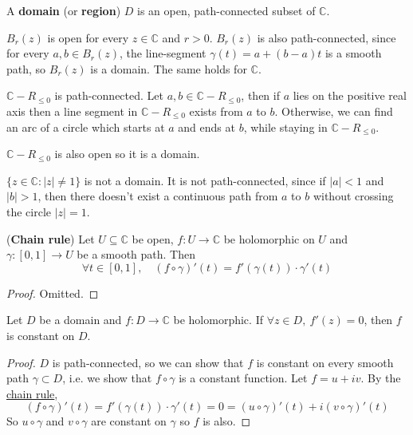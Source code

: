 \begin{definition}
	A \textbf{domain} (or \textbf{region}) $D$ is an open, path-connected subset of $\mathbb{C}$.
\end{definition}

\begin{example}
	$B_r(z)$ is open for every $z \in \mathbb{C}$ and $r > 0$. $B_r(z)$ is also path-connected, since for every $a, b \in B_r(z)$, the line-segment $\gamma(t) = a + (b - a)t$ is a smooth path, so $B_r(z)$ is a domain. The same holds for $\mathbb{C}$.
\end{example}

\begin{example}
	$\mathbb{C} - R_{\le 0}$ is path-connected. Let $a, b \in \mathbb{C} - R_{\le 0}$, then if $a$ lies on the positive real axis then a line segment in $\mathbb{C} - R_{\le 0}$ exists from $a$ to $b$. Otherwise, we can find an arc of a circle which starts at $a$ and ends at $b$, while staying in $\mathbb{C} - R_{\le 0}$.

	$\mathbb{C} - R_{\le 0}$ is also open so it is a domain.
\end{example}

\begin{example}
	$\{ z \in \mathbb{C}: |z| \ne 1 \}$ is not a domain. It is not path-connected, since if $|a| < 1$ and $|b| > 1$, then there doesn't exist a continuous path from $a$ to $b$ without crossing the circle $|z| = 1$.
\end{example}

\begin{lemma}\label{lem:chainRuleForPaths}
	(\textbf{Chain rule}) Let $U \subseteq \mathbb{C}$ be open, $f: U \to \mathbb{C}$ be holomorphic on $U$ and $\gamma: [0, 1] \to U$ be a smooth path. Then
	\[
		\forall t \in [0, 1], \quad (f \circ \gamma)'(t) = f'(\gamma(t)) \cdot \gamma'(t)
	\]
\end{lemma}

\begin{proof}
	Omitted.
\end{proof}

\begin{theorem}
	Let $D$ be a domain and $f: D \to \mathbb{C}$ be holomorphic. If $\forall z \in D, \ f'(z) = 0$, then $f$ is constant on $D$.
\end{theorem}

\begin{proof}
	$D$ is path-connected, so we can show that $f$ is constant on every smooth path $\gamma \subset D$, i.e. we show that $f \circ \gamma$ is a constant function. Let $f = u + iv$. By the \hyperref[lem:chainRuleForPaths]{chain rule},
	\[
		(f \circ \gamma)'(t) = f'(\gamma(t)) \cdot \gamma'(t) = 0 = (u \circ \gamma)'(t) + i (v \circ \gamma)'(t)
	\]
	So $u \circ \gamma$ and $v \circ \gamma$ are constant on $\gamma$ so $f$ is also.
\end{proof}

